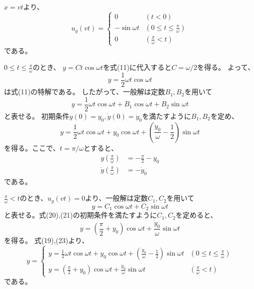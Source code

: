 \documentclass[a4paper]{jsarticle}
\begin{document}
\subsection{}
$x = vt$より、
\begin{equation}
  u_g(vt) = 
  \begin{cases}
    0 & (t < 0) \\
    -\sin \omega t & (0 \leq t \leq \frac{\pi}{\omega}) \\
    0 & (\frac{\pi}{\omega} < t)
  \end{cases}
\end{equation}
である。\par
$0 \leq t \leq \frac{\pi}{\omega}$のとき、
$y = C t \cos \omega t$を式(11)に代入すると$C = \omega / 2$を得る。
よって、
\begin{equation}
  y = \frac{1}{2} \omega t \cos \omega t
\end{equation}
は式(11)の特解である。
したがって、一般解は定数$B_1, B_2$を用いて
\begin{equation}
  y = \frac{1}{2} \omega t \cos \omega t + B_1 \cos \omega t + B_2 \sin \omega t
\end{equation}
と表せる。
初期条件$y(0) = y_0, \dot{y}(0) = \dot{y}_0$を満たすように$B_1,B_2$を定め、
\begin{equation}
  y = \frac{1}{2} \omega t \cos \omega t + y_0 \cos \omega t 
  + \left(\frac{\dot{y}_0}{\omega} - \frac{1}{2}\right) \sin \omega t
\end{equation}
を得る。ここで、$t = \pi / \omega$とすると、
\begin{align}
  y\left(\frac{\pi}{\omega}\right) &= -\frac{\pi}{2} - y_0 \\
  \dot{y}\left(\frac{\pi}{\omega}\right) &= -\dot{y}_0
\end{align}
である。\par
$\frac{\pi}{\omega} < t$のとき、$u_g(vt) = 0$より、一般解は定数$C_1, C_2$を用いて
\begin{equation}
  y = C_1 \cos \omega t + C_2 \sin \omega t
\end{equation}
と表せる。式(20),(21)の初期条件を満たすように$C_1,C_2$を定めると、
\begin{equation}
  y = \left(\frac{\pi}{2} + y_0\right) \cos \omega t + \frac{\dot{y}_0}{\omega} \sin \omega t
\end{equation}
を得る。
式(19),(23)より、
\begin{equation}
  y = 
  \begin{cases}
    y = \frac{1}{2} \omega t \cos \omega t + y_0 \cos \omega t 
    + \left(\frac{\dot{y}_0}{\omega} - \frac{1}{2}\right) \sin \omega t
    & \left(0 \leq t \leq \frac{\pi}{\omega}\right) \\
    y = \left(\frac{\pi}{2} + y_0\right) \cos \omega t + \frac{\dot{y}_0}{\omega} \sin \omega t
    & \left(\frac{\pi}{\omega} < t\right)
  \end{cases}
\end{equation}
である。
\end{document}
